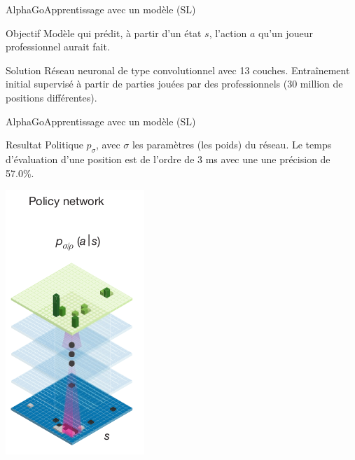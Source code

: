 \begin{frame}{AlphaGo}{Apprentissage avec un modèle (SL)}
    \begin{center}

        \begin{block}{Objectif}
            Modèle qui prédit, à partir d'un état $s$, l'action $a$ qu'un joueur professionnel aurait fait.
        \end{block}
        \vspace{1cm}
        \begin{block}{Solution}
            Réseau neuronal de type convolutionnel avec 13 couches.
            Entraînement initial supervisé à partir de parties jouées par des professionnels (30 million de positions différentes).
        \end{block}
    \end{center}
\end{frame}

\begin{frame}{AlphaGo}{Apprentissage avec un modèle (SL)}
    \begin{block}{Resultat}
        Politique $p_\sigma$, avec $\sigma$ les paramètres (les poids) du réseau.
        Le temps d'évaluation d'une position est de l'ordre de 3 ms avec une une précision de 57.0\%.
    \end{block}
    \begin{center}
        \includegraphics[scale=0.4]{ressources/AlphaGo/Policy_Network}
    \end{center}
\end{frame}


